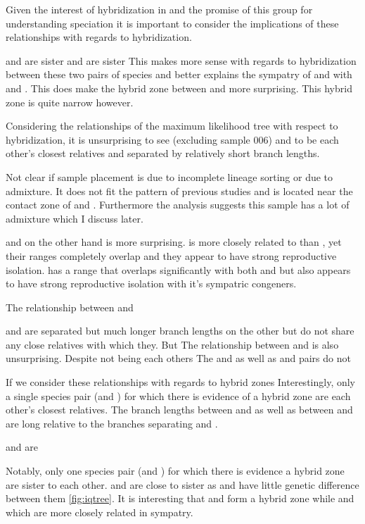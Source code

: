 Given the interest of hybridization in \anaxyrus and the promise of this 
group for understanding speciation it is important to consider the 
implications of these relationships with regards to hybridization.  

\amer and \terr are sister
\fowl and \wood are sister
This makes more sense with regards to hybridization between these two pairs 
of species and better explains the sympatry of \amer and \terr 
with \fowl and \wood.
This does make the hybrid zone between \amer and \hemiophrys more surprising. 
This hybrid zone is quite narrow however. 

Considering the relationships of the maximum likelihood tree with respect to 
hybridization, it is unsurprising to see \fowl (excluding sample 006) and \wood 
to be each other's closest relatives and separated by relatively short branch lengths.

Not clear if \fowl sample placement is due to incomplete lineage sorting or
due to admixture. It does not fit the pattern of previous studies and is located
near the contact zone of \wood and \fowl. Furthermore the \structure analysis 
suggests this sample has a lot of admixture which I discuss later.

\amer and \terr on the other hand is more surprising. 
\terr is more closely related to \fowl than \amer, yet their ranges completely  
overlap and they appear to have strong reproductive isolation.
\amer has a range that overlaps significantly with both \wood and \fowl but 
also appears to have strong reproductive isolation with it's sympatric congeners.

The relationship between \hemiophrys and \amer 

\hemiophrys and \amer are separated but much longer branch lengths on the other
but do not share any close relatives with which they.
But 
The relationship between \amer and \hemiophrys is also unsurprising.
Despite not being each others 
The \amer and \hemiophrys as well as \amer and \terr pairs do not   

If we consider these relationships with regards to hybrid zones 
Interestingly, only a single species pair (\fowl and \wood) for which there is  
evidence of a hybrid zone are each other's closest relatives.
The branch lengths between \amer and \hemiophrys as well as between \amer and \terr 
are long relative to the branches separating \wood and \fowl.

\terr and \fowl are 

Notably, only one species pair (\fowl and \wood) for which there is evidence a 
hybrid zone are sister to each other. 
\amer and \hemiophrys are close to sister as \hemiophrys and \baxteri have 
little genetic difference between them \cref{fig:iqtree}.
It is interesting that \amer and \terr form a hybrid zone while \fowl and \terr
which are more closely related in sympatry. 

